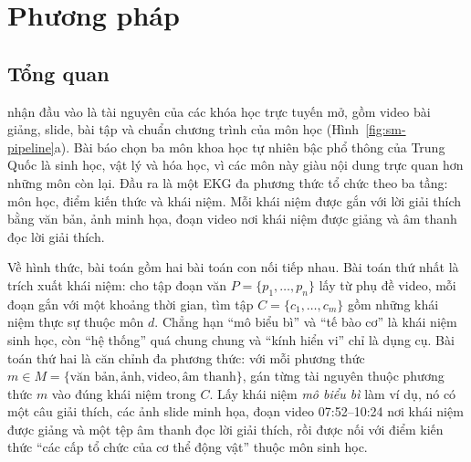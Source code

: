 
\section{Phương pháp}\label{sec:sm-method}
\subsection{Tổng quan}\label{sec:sm-overview}
\SM{} nhận đầu vào là tài nguyên của các khóa học trực tuyến mở, gồm video bài giảng, slide, bài tập và chuẩn chương trình của môn học (Hình~\ref{fig:sm-pipeline}a).
Bài báo chọn ba môn khoa học tự nhiên bậc phổ thông của Trung Quốc là sinh học, vật lý và hóa học, vì các môn này giàu nội dung trực quan hơn những môn còn lại.
Đầu ra là một EKG đa phương thức tổ chức theo ba tầng: môn học, điểm kiến thức và khái niệm.
Mỗi khái niệm được gắn với lời giải thích bằng văn bản, ảnh minh họa, đoạn video nơi khái niệm được giảng và âm thanh đọc lời giải thích.

Về hình thức, bài toán gồm hai bài toán con nối tiếp nhau.
Bài toán thứ nhất là trích xuất khái niệm: cho tập đoạn văn $P=\{p_1,\dots,p_n\}$ lấy từ phụ đề video, mỗi đoạn gắn với một khoảng thời gian, tìm tập $C=\{c_1,\dots,c_m\}$ gồm những khái niệm thực sự thuộc môn $d$.
Chẳng hạn ``mô biểu bì'' và ``tế bào cơ'' là khái niệm sinh học, còn ``hệ thống'' quá chung chung và ``kính hiển vi'' chỉ là dụng cụ.
Bài toán thứ hai là căn chỉnh đa phương thức: với mỗi phương thức $m\in M=\{\text{văn bản},\text{ảnh},\text{video},\text{âm thanh}\}$, gán từng tài nguyên thuộc phương thức $m$ vào đúng khái niệm trong $C$.
Lấy khái niệm \emph{mô biểu bì} làm ví dụ, nó có một câu giải thích, các ảnh slide minh họa, đoạn video 07:52--10:24 nơi khái niệm được giảng và một tệp âm thanh đọc lời giải thích, rồi được nối với điểm kiến thức ``các cấp tổ chức của cơ thể động vật'' thuộc môn sinh học.

